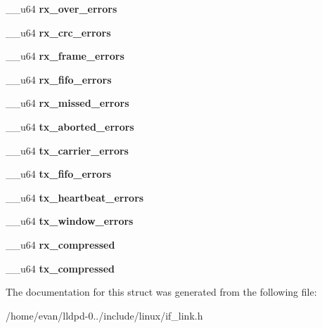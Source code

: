 \begin{DoxyCompactItemize}
\item 
\-\_\-\-\_\-u64 {\bfseries rx\-\_\-over\-\_\-errors}\label{structrtnl__link__stats64_a105345a23875c06ef4f9eb5c55ae04a7}

\item 
\-\_\-\-\_\-u64 {\bfseries rx\-\_\-crc\-\_\-errors}\label{structrtnl__link__stats64_a3dadb44d9627c33e6da4c715399c8356}

\item 
\-\_\-\-\_\-u64 {\bfseries rx\-\_\-frame\-\_\-errors}\label{structrtnl__link__stats64_a218b10eced35ebbf590b90b77907464a}

\item 
\-\_\-\-\_\-u64 {\bfseries rx\-\_\-fifo\-\_\-errors}\label{structrtnl__link__stats64_a2e6af6efcb1764bb8245b8022ea17b08}

\item 
\-\_\-\-\_\-u64 {\bfseries rx\-\_\-missed\-\_\-errors}\label{structrtnl__link__stats64_af2109068eb61148cc6b5f313074a53ad}

\item 
\-\_\-\-\_\-u64 {\bfseries tx\-\_\-aborted\-\_\-errors}\label{structrtnl__link__stats64_a86faee4605b61f7519975316b893b0da}

\item 
\-\_\-\-\_\-u64 {\bfseries tx\-\_\-carrier\-\_\-errors}\label{structrtnl__link__stats64_a6e0ce2b1eaad554933a0dde4419b50a6}

\item 
\-\_\-\-\_\-u64 {\bfseries tx\-\_\-fifo\-\_\-errors}\label{structrtnl__link__stats64_a9437dfa4ce8591bb2b25b47c6c62a295}

\item 
\-\_\-\-\_\-u64 {\bfseries tx\-\_\-heartbeat\-\_\-errors}\label{structrtnl__link__stats64_a2e4f7085db003bc5e74c6b5e0f3bcb4c}

\item 
\-\_\-\-\_\-u64 {\bfseries tx\-\_\-window\-\_\-errors}\label{structrtnl__link__stats64_a2499db065a152f33191e63b96f0e7444}

\item 
\-\_\-\-\_\-u64 {\bfseries rx\-\_\-compressed}\label{structrtnl__link__stats64_aaaf3346a97c951ecc5df4aeeafa46e1d}

\item 
\-\_\-\-\_\-u64 {\bfseries tx\-\_\-compressed}\label{structrtnl__link__stats64_a9efcdc99164f411379e14eb8153b5054}

\end{DoxyCompactItemize}


\-The documentation for this struct was generated from the following file\-:\begin{DoxyCompactItemize}
\item 
/home/evan/lldpd-\/0../include/linux/if\-\_\-link.\-h\end{DoxyCompactItemize}
